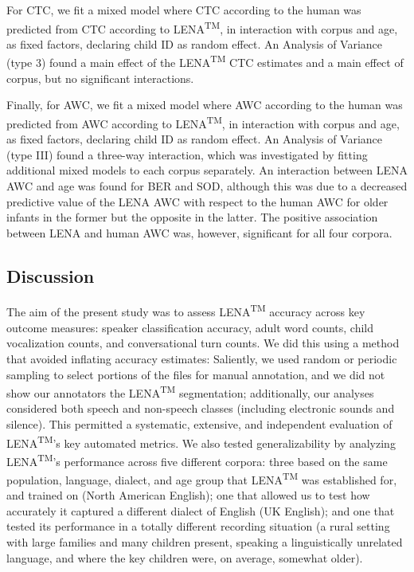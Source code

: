 \documentclass[english,floatsintext,man]{apa6}
\begin{document}
For CTC, we fit a mixed model where CTC according to the human was
predicted from CTC according to LENA\textsuperscript{TM}, in interaction
with corpus and age, as fixed factors, declaring child ID as random
effect. An Analysis of Variance (type 3) found a main effect of the
LENA\textsuperscript{TM} CTC estimates and a main effect of corpus, but
no significant interactions.

Finally, for AWC, we fit a mixed model where AWC according to the human
was predicted from AWC according to LENA\textsuperscript{TM}, in
interaction with corpus and age, as fixed factors, declaring child ID as
random effect. An Analysis of Variance (type III) found a three-way
interaction, which was investigated by fitting additional mixed models
to each corpus separately. An interaction between LENA AWC and age was
found for BER and SOD, although this was due to a decreased predictive
value of the LENA AWC with respect to the human AWC for older infants in
the former but the opposite in the latter. The positive association
between LENA and human AWC was, however, significant for all four
corpora.

\subsection{Discussion}\label{discussion}

The aim of the present study was to assess LENA\textsuperscript{TM}
accuracy across key outcome measures: speaker classification accuracy,
adult word counts, child vocalization counts, and conversational turn
counts. We did this using a method that avoided inflating accuracy
estimates: Saliently, we used random or periodic sampling to select
portions of the files for manual annotation, and we did not show our
annotators the LENA\textsuperscript{TM} segmentation; additionally, our
analyses considered both speech and non-speech classes (including
electronic sounds and silence). This permitted a systematic, extensive,
and independent evaluation of LENA\textsuperscript{TM}'s key automated
metrics. We also tested generalizability by analyzing
LENA\textsuperscript{TM}'s performance across five different corpora:
three based on the same population, language, dialect, and age group
that LENA\textsuperscript{TM} was established for, and trained on (North
American English); one that allowed us to test how accurately it
captured a different dialect of English (UK English); and one that
tested its performance in a totally different recording situation (a
rural setting with large families and many children present, speaking a
linguistically unrelated language, and where the key children were, on
average, somewhat older).
\end{document}
